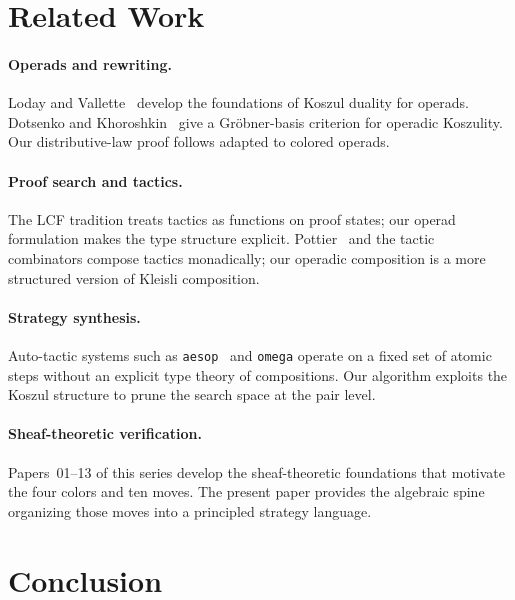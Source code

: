 \documentclass[11pt]{article}
\begin{document}
\section{Related Work}\label{sec:related}

\paragraph{Operads and rewriting.}
Loday and Vallette~\cite{Loday2012AlgebrasOperads} develop the
foundations of Koszul duality for operads.
Dotsenko and Khoroshkin~\cite{Dotsenko2010GrobnerBases} give a
Gr\"obner-basis criterion for operadic Koszulity.
Our distributive-law proof follows \cite[Thm.~4.2.5]{Loday2012AlgebrasOperads}
adapted to colored operads.

\paragraph{Proof search and tactics.}
The LCF tradition \cite{Gordon1979LCF} treats tactics as functions on
proof states; our operad formulation makes the type structure explicit.
Pottier~\cite{Pottier2010OmegaCoq} and the \LEAN{} tactic combinators
\cite{deMoura2021Lean4} compose tactics monadically; our operadic
composition is a more structured version of Kleisli composition.

\paragraph{Strategy synthesis.}
Auto-tactic systems such as \texttt{aesop}~\cite{Limperg2023Aesop}
and \texttt{omega} operate on a fixed set of atomic steps without an
explicit type theory of compositions.
Our algorithm exploits the Koszul structure to prune the search
space at the pair level.

\paragraph{Sheaf-theoretic verification.}
Papers~01--13 of this series develop the sheaf-theoretic foundations
that motivate the four colors and ten moves.
The present paper provides the algebraic spine organizing those moves
into a principled strategy language.

\section{Conclusion}\label{sec:conclusion}
\end{document}
